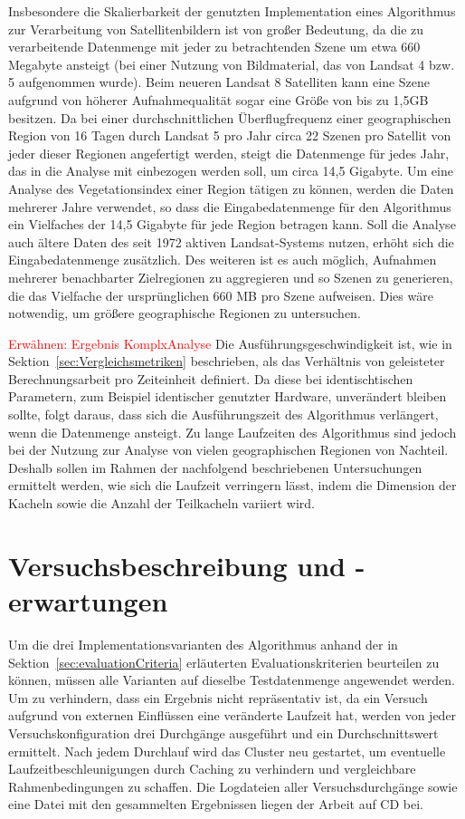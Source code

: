 Insbesondere die Skalierbarkeit der genutzten Implementation eines Algorithmus zur Verarbeitung von Satellitenbildern ist von großer Bedeutung, da die zu verarbeitende Datenmenge mit jeder zu betrachtenden Szene um etwa 660 Megabyte ansteigt (bei einer Nutzung von Bildmaterial, das von Landsat 4 bzw. 5 aufgenommen wurde). Beim neueren Landsat 8 Satelliten kann eine Szene aufgrund von höherer Aufnahmequalität sogar eine Größe von bis zu 1,5GB besitzen. Da bei einer durchschnittlichen Überflugfrequenz einer geographischen Region von 16 Tagen durch Landsat 5 pro Jahr circa 22 Szenen pro Satellit von jeder dieser Regionen angefertigt werden, steigt die Datenmenge für jedes Jahr, das in die Analyse mit einbezogen werden soll, um circa 14,5 Gigabyte. Um eine Analyse des Vegetationsindex einer Region tätigen zu können, werden die Daten mehrerer Jahre verwendet, so dass die Eingabedatenmenge für den Algorithmus ein Vielfaches der 14,5 Gigabyte für jede Region betragen kann. Soll die Analyse auch ältere Daten des seit 1972 aktiven Landsat-Systems nutzen, erhöht sich die Eingabedatenmenge zusätzlich. Des weiteren ist es auch möglich, Aufnahmen mehrerer benachbarter Zielregionen zu aggregieren und so Szenen zu generieren, die das Vielfache der ursprünglichen 660 MB pro Szene aufweisen. Dies wäre notwendig, um größere geographische Regionen zu untersuchen.

\textcolor{red}{Erwähnen: Ergebnis KomplxAnalyse}
Die Ausführungsgeschwindigkeit ist, wie in Sektion~\ref{sec:Vergleichsmetriken} beschrieben, als das Verhältnis von geleisteter Berechnungsarbeit pro Zeiteinheit definiert. Da diese bei identischtischen Parametern, zum Beispiel identischer genutzter Hardware, unverändert bleiben sollte, folgt daraus, dass sich die Ausführungszeit des Algorithmus verlängert, wenn die Datenmenge ansteigt. Zu lange Laufzeiten des Algorithmus sind jedoch bei der Nutzung zur Analyse von vielen geographischen Regionen von Nachteil. Deshalb sollen im Rahmen der nachfolgend beschriebenen Untersuchungen ermittelt werden, wie sich die Laufzeit verringern lässt, indem die Dimension der Kacheln sowie die Anzahl der Teilkacheln variiert wird.

\section{Versuchsbeschreibung und -erwartungen}
Um die drei Implementationsvarianten des Algorithmus anhand der in Sektion~\ref{sec:evaluationCriteria} erläuterten Evaluationskriterien beurteilen zu können, müssen alle Varianten auf dieselbe Testdatenmenge angewendet werden. Um zu verhindern, dass ein Ergebnis nicht repräsentativ ist, da ein Versuch aufgrund von externen Einflüssen eine veränderte Laufzeit hat, werden von jeder Versuchskonfiguration drei Durchgänge ausgeführt und ein Durchschnittswert ermittelt. Nach jedem Durchlauf wird das Cluster neu gestartet, um eventuelle Laufzeitbeschleunigungen durch Caching zu verhindern und vergleichbare Rahmenbedingungen zu schaffen. Die Logdateien aller Versuchsdurchgänge sowie eine Datei mit den gesammelten Ergebnissen liegen der Arbeit auf CD bei.

